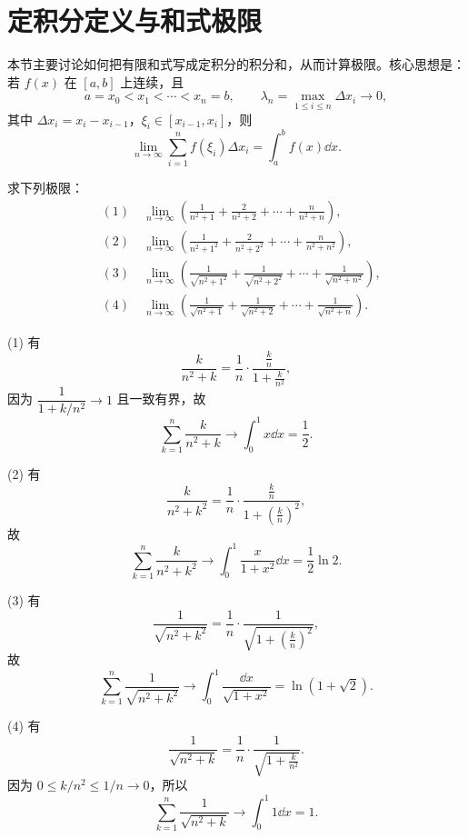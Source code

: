 \section{定积分定义与和式极限}

本节主要讨论如何把有限和式写成定积分的积分和，从而计算极限。核心思想是：若 $f(x)$ 在 $[a,b]$ 上连续，且
\[
a=x_0<x_1<\cdots <x_n=b,\qquad \lambda_n=\max_{1\leq i\leq n}\Delta x_i\to 0,
\]
其中 $\Delta x_i=x_i-x_{i-1}$，$\xi_i\in[x_{i-1},x_i]$，则
\[
\lim_{n\to\infty}\sum_{i=1}^n f(\xi_i)\Delta x_i=\int_a^b f(x)\dd x.
\]



\begin{problem}
	求下列极限：
	\[
	\begin{aligned}
		&(1)\quad \lim_{n\to\infty}\left(\frac1{n^2+1}+\frac2{n^2+2}+\cdots+\frac n{n^2+n}\right),\\
		&(2)\quad \lim_{n\to\infty}\left(\frac1{n^2+1^2}+\frac2{n^2+2^2}+\cdots+\frac n{n^2+n^2}\right),\\
		&(3)\quad \lim_{n\to\infty}\left(\frac1{\sqrt{n^2+1^2}}+\frac1{\sqrt{n^2+2^2}}+\cdots+\frac1{\sqrt{n^2+n^2}}\right),\\
		&(4)\quad \lim_{n\to\infty}\left(\frac1{\sqrt{n^2+1}}+\frac1{\sqrt{n^2+2}}+\cdots+\frac1{\sqrt{n^2+n}}\right).
	\end{aligned}
	\]
\end{problem}

\begin{solution}
	(1) 有
	\[
	\frac{k}{n^2+k}=\frac1n\cdot \frac{\frac{k}{n}}{1+\frac{k}{n^2}},
	\]
	因为 $\dfrac1{1+k/n^2}\to1$ 且一致有界，故
	\[
	\sum_{k=1}^n\frac{k}{n^2+k}\to \int_0^1x\dd x=\frac12.
	\]
	
	(2) 有
	\[
	\frac{k}{n^2+k^2}=\frac1n\cdot\frac{\frac{k}{n}}{1+\left(\frac{k}{n}\right)^2},
	\]
	故
	\[
	\sum_{k=1}^n\frac{k}{n^2+k^2}\to
	\int_0^1\frac{x}{1+x^2}\dd x=\frac12\ln2.
	\]
	
	(3) 有
	\[
	\frac1{\sqrt{n^2+k^2}}=\frac1n\cdot\frac1{\sqrt{1+\left(\frac{k}{n}\right)^2}},
	\]
	故
	\[
	\sum_{k=1}^n\frac1{\sqrt{n^2+k^2}}\to
	\int_0^1\frac{\dd x}{\sqrt{1+x^2}}=\ln(1+\sqrt2).
	\]
	
	(4) 有
	\[
	\frac1{\sqrt{n^2+k}}=\frac1n\cdot\frac1{\sqrt{1+\frac{k}{n^2}}}.
	\]
	因为 $0\leq k/n^2\leq 1/n\to0$，所以
	\[
	\sum_{k=1}^n\frac1{\sqrt{n^2+k}}\to \int_0^1 1\dd x=1.
	\]
\end{solution}

